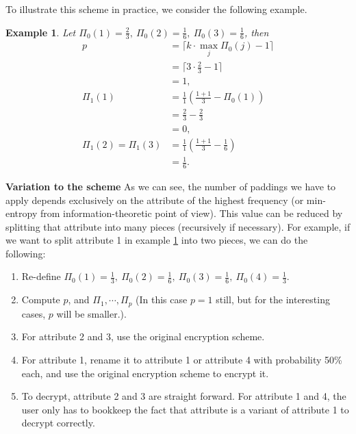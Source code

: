 \documentclass[10pt]{book}
\newtheorem{example}{Example}
\begin{document}
To illustrate this scheme in practice, we consider the following example.
\begin{example} \label{Example 1}
Let $\Pi_0(1) = \frac{2}{3}, \ \Pi_0(2) = \frac{1}{6}, \ \Pi_0(3) = \frac{1}{6}$, then
\begin{align*}
	p & = \lceil k \cdot \max_{j}{\Pi_0(j)} - 1 \rceil	\\
	  & = \lceil 3 \cdot \frac{2}{3} - 1 \rceil	\\
	  & = 1,	\\
	\Pi_1(1) & = \frac{1}{1} \left( \frac{1+1}{3} - \Pi_0(1) \right) \\
			 & = \frac{2}{3} - \frac{2}{3} \\
			 & = 0,	\\
	\Pi_1(2) = \Pi_1(3) & = \frac{1}{1} \left( \frac{1+1}{3} - \frac{1}{6} \right) \\
						& = \frac{1}{6}.
\end{align*}
\end{example}

\textbf{Variation to the scheme} As we can see, the number of paddings we have to apply depends exclusively on the attribute of the highest frequency (or min-entropy from information-theoretic point of view). This value can be reduced by splitting that attribute into many pieces (recursively if necessary). For example, if we want to split attribute 1 in example \ref{Example 1} into two pieces, we can do the following:
\begin{enumerate}
\item Re-define $\Pi_0(1) = \frac{1}{3}, \ \Pi_0(2) = \frac{1}{6}, \ \Pi_0(3) = \frac{1}{6}, \ \Pi_0(4) = \frac{1}{3}$.
\item Compute $p$, and $\Pi_1, \cdots, \Pi_p$ (In this case $p = 1$ still, but for the interesting cases, $p$ will be smaller.).
\item For attribute 2 and 3, use the original encryption scheme.
\item For attribute 1, rename it to attribute 1 or attribute 4 with probability 50\% each, and use the original encryption scheme to encrypt it.
\item To decrypt, attribute 2 and 3 are straight forward. For attribute 1 and 4, the user only has to bookkeep the fact that attribute is a variant of attribute 1 to decrypt correctly.
\end{enumerate}







{}
\end{document}
